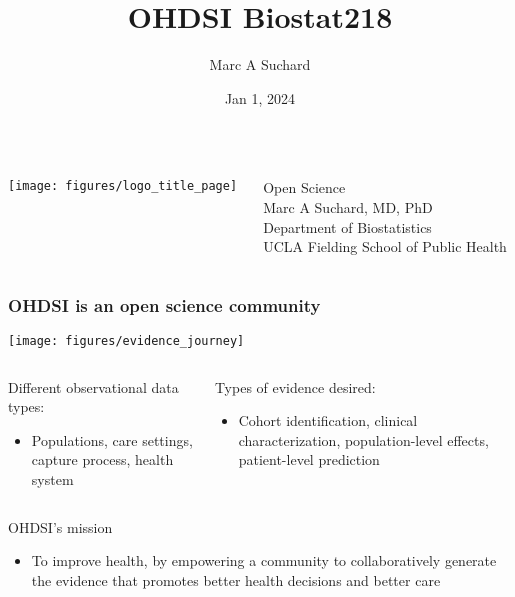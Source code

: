 \documentclass[11pt
,fragile=singleslide
,xcolor=dvipsnames, 
aspectratio=169 %
]{beamer}
\title[
OHDSI Biostat218
]
{
OHDSI Biostat218
}
\subtitle
{} %
\author{Marc A Suchard}
\institute[OHDSI] %
{
	Department of Greatness \\
	School of Awesome Health Data Science Research
}
\date{Jan 1, 2024}
\begin{document}
	
	\begin{frame}
		\begin{columns}
			\begin{column}{0.33\textwidth}
				\texttt{[image: figures/logo\_title\_page]}
			\end{column}
			\begin{column}{0.66\textwidth}
				\begin{center}
					{\LARGE
						Open Science} \\[2em]
					
						Marc A Suchard, MD, PhD \\[0.5em]
						Department of Biostatistics \\ 
						UCLA Fielding School of Public Health\\[1em]
				\end{center}
			\end{column}
		\end{columns}
		\vspace{1em}
		\vspace{1em}
		
	\end{frame}
	
\begin{frame}
	\frametitle{OHDSI is an open science community}

	\centerline{\texttt{[image: figures/evidence\_journey]}}

	\begin{columns}[T]
	\begin{column}{0.5\textwidth}
	Different observational data types:
	\begin{itemize}
		\item {\small Populations, care settings, capture process, health system}
	\end{itemize}
	\end{column}
	\begin{column}{0.5\textwidth}
	Types of evidence desired:
	\begin{itemize}
		\item {\small Cohort identification, clinical characterization, population-level effects, patient-level prediction}
	\end{itemize}
	\end{column}
	\end{columns}

	\begin{block}{OHDSI's mission}
	\begin{itemize}
\item To improve health, by empowering a community to collaboratively generate the evidence that promotes better health decisions and better care
\end{itemize}
	\end{block}

\end{frame}
\end{document}
